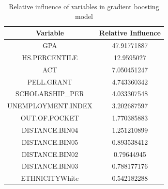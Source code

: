 \documentclass[12pt,english]{report}
\begin{document}
\begin{table}[H]
\centering
\caption{Relative influence of variables in gradient boosting model}
\label{relatice_influ}
\begin{tabular}{|c|c|} \hline
Variable                        & Relative Influence \\ \hline
GPA                             & 47.91771887        \\ \hline
HS.PERCENTILE                   & 12.9595027         \\ \hline
ACT                             & 7.050451247        \\ \hline
PELL.GRANT                      & 4.743360342        \\ \hline
SCHOLARSHIP\_PER                & 4.033307548        \\ \hline
UNEMPLOYMENT.INDEX              & 3.202687597        \\ \hline
OUT.OF.POCKET                   & 1.770385883        \\ \hline
DISTANCE.BIN04                  & 1.251210899        \\ \hline
DISTANCE.BIN05                  & 0.893538412        \\ \hline
DISTANCE.BIN02                  & 0.79644945         \\ \hline
DISTANCE.BIN03                  & 0.788177176        \\ \hline
ETHNICITYWhite                  & 0.542182288        \\ \hline
\end{tabular}
\end{table}
\end{document}
